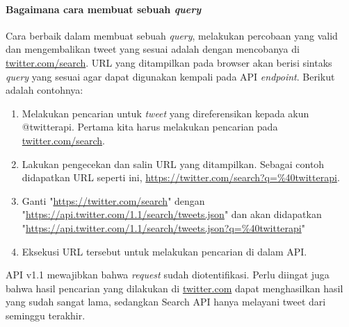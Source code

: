 \paragraph{Bagaimana cara membuat sebuah \textit{query}}
Cara berbaik dalam membuat sebuah \textit{query}, melakukan percobaan yang valid dan mengembalikan tweet yang sesuai adalah dengan mencobanya di \url{twitter.com/search}. URL yang ditampilkan pada browser akan berisi sintaks \textit{query} yang sesuai agar dapat digunakan kempali pada API \textit{endpoint}. Berikut adalah contohnya:

\begin{enumerate}
	\item Melakukan pencarian untuk \textit{tweet} yang direferensikan kepada akun @twitterapi. Pertama kita harus melakukan pencarian pada \url{twitter.com/search}.
	\item Lakukan pengecekan dan salin URL yang ditampilkan. Sebagai contoh didapatkan URL seperti ini, \url{https://twitter.com/search?q=\%40twitterapi}.
	\item Ganti "\url{https://twitter.com/search}" dengan "\url{https://api.twitter.com/1.1/search/tweets.json}" dan akan didapatkan "\url{https://api.twitter.com/1.1/search/tweets.json?q=\%40twitterapi}"
	\item Eksekusi URL tersebut untuk melakukan pencarian di dalam API.
\end{enumerate}

API v1.1 mewajibkan bahwa \textit{request} sudah diotentifikasi. Perlu diingat juga bahwa hasil pencarian yang dilakukan di \url{twitter.com} dapat menghasilkan hasil yang sudah sangat lama, sedangkan Search API hanya melayani tweet dari seminggu terakhir.

